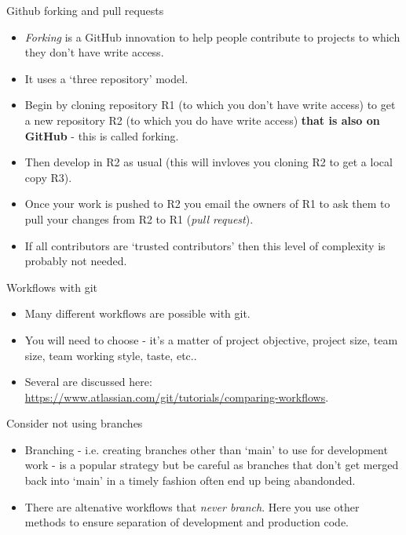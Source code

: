\documentclass[usenames,dvipsnames]{beamer}
\begin{document}
\begin{frame}{Github forking and pull requests}
  \begin{block}{}
    \begin{itemize}
      \item{\textit{Forking} is a GitHub innovation to help people contribute to projects to which they don't have write access.}
      \item{It uses a `three repository' model.}
      \item{Begin by cloning repository R1 (to which you don't have write access) to get a new repository R2 (to which you do have write access) \textbf{that is also on GitHub} - this is called forking.}
      \item{Then develop in R2 as usual (this will invloves you cloning R2 to get a local copy R3).}
      \item{Once your work is pushed to R2 you email the owners of R1 to ask them to pull your changes from R2 to R1 (\textit{pull request}).}
      \item{If all contributors are `trusted contributors' then this level of complexity is probably not needed.}
    \end{itemize}
  \end{block}
\end{frame}

\begin{frame}{Workflows with git}
  \begin{block}{}
    \begin{itemize}
      \item{Many different workflows are possible with git.}
      \item{You will need to choose - it's a matter of project objective, project size, team size, team working style, taste, etc..}
      \item{Several are discussed here: \url{https://www.atlassian.com/git/tutorials/comparing-workflows}.}
    \end{itemize}
  \end{block}
\end{frame}

\begin{frame}{Consider not using branches}
  \begin{block}{}
    \begin{itemize}
      \item{Branching - i.e. creating branches other than `main' to use for development work - is a popular strategy but be careful as branches that don't get merged back into `main' in a timely fashion often end up being abandonded.}
      \item{There are altenative workflows that \textit{never branch}. Here you use other methods to ensure separation of development and production code.}

    \end{itemize}
  \end{block}
\end{frame}
\end{document}
